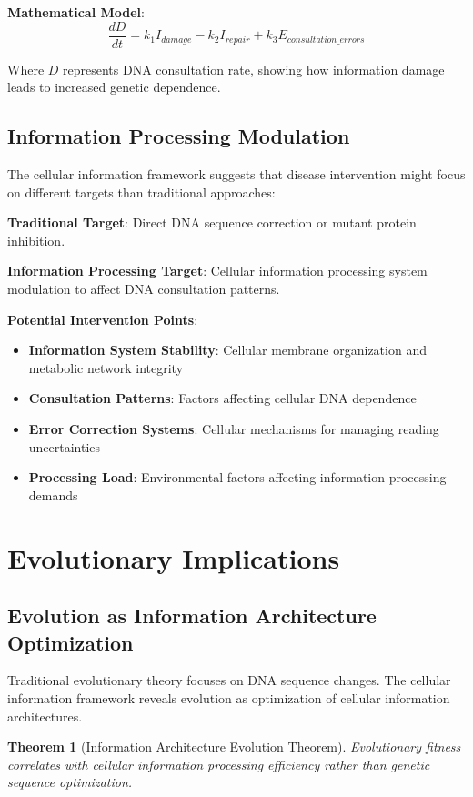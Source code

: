 \documentclass[12pt,a4paper]{article}
\newtheorem{theorem}{Theorem}[section]
\begin{document}
\textbf{Mathematical Model}:
$$\frac{dD}{dt} = k_1 I_{damage} - k_2 I_{repair} + k_3 E_{consultation\_errors}$$

Where $D$ represents DNA consultation rate, showing how information damage leads to increased genetic dependence.

\subsection{Information Processing Modulation}

The cellular information framework suggests that disease intervention might focus on different targets than traditional approaches:

\textbf{Traditional Target}: Direct DNA sequence correction or mutant protein inhibition.

\textbf{Information Processing Target}: Cellular information processing system modulation to affect DNA consultation patterns.

\textbf{Potential Intervention Points}:
\begin{itemize}
\item \textbf{Information System Stability}: Cellular membrane organization and metabolic network integrity
\item \textbf{Consultation Patterns}: Factors affecting cellular DNA dependence
\item \textbf{Error Correction Systems}: Cellular mechanisms for managing reading uncertainties
\item \textbf{Processing Load}: Environmental factors affecting information processing demands
\end{itemize}

\section{Evolutionary Implications}

\subsection{Evolution as Information Architecture Optimization}

Traditional evolutionary theory focuses on DNA sequence changes. The cellular information framework reveals evolution as optimization of cellular information architectures.

\begin{theorem}[Information Architecture Evolution Theorem]
Evolutionary fitness correlates with cellular information processing efficiency rather than genetic sequence optimization.
\end{theorem}
\end{document}
